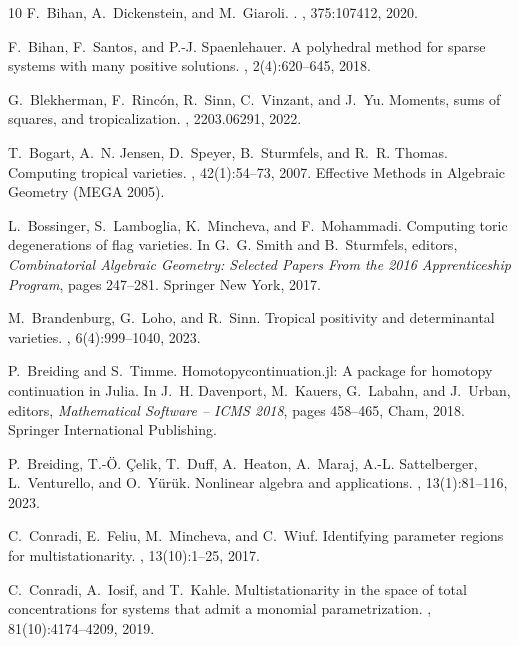 \documentclass{article}
\theoremstyle{definition}
\begin{document}
{\begin{thebibliography}{10}
F.~Bihan, A.~Dickenstein, and M.~Giaroli.
.
, 375:107412, 2020.

F.~Bihan, F.~Santos, and P.-J. Spaenlehauer.
\newblock A polyhedral method for sparse systems with many positive solutions.
, 2(4):620--645, 2018.

G.~Blekherman, F.~Rincón, R.~Sinn, C.~Vinzant, and J.~Yu.
\newblock Moments, sums of squares, and tropicalization.
, 2203.06291, 2022.

T.~Bogart, A.~N. Jensen, D.~Speyer, B.~Sturmfels, and R.~R. Thomas.
\newblock Computing tropical varieties.
, 42(1):54--73, 2007.
\newblock Effective Methods in Algebraic Geometry (MEGA 2005).

L.~Bossinger, S.~Lamboglia, K.~Mincheva, and F.~Mohammadi.
\newblock Computing toric degenerations of flag varieties.
\newblock In G.~G. Smith and B.~Sturmfels, editors, {\em Combinatorial Algebraic Geometry: Selected Papers From the 2016 Apprenticeship Program}, pages 247--281. Springer New York, 2017.

M.~Brandenburg, G.~Loho, and R.~Sinn.
\newblock Tropical positivity and determinantal varieties.
, 6(4):999--1040, 2023.

P.~Breiding and S.~Timme.
\newblock Homotopycontinuation.jl: A package for homotopy continuation in {J}ulia.
\newblock In J.~H. Davenport, M.~Kauers, G.~Labahn, and J.~Urban, editors, {\em Mathematical Software -- ICMS 2018}, pages 458--465, Cham, 2018. Springer International Publishing.

P.~Breiding, T.-Ö. Çelik, T.~Duff, A.~Heaton, A.~Maraj, A.-L. Sattelberger, L.~Venturello, and O.~Yürük.
\newblock Nonlinear algebra and applications.
, 13(1):81--116, 2023.

C.~Conradi, E.~Feliu, M.~Mincheva, and C.~Wiuf.
\newblock Identifying parameter regions for multistationarity.
, 13(10):1--25, 2017.

C.~Conradi, A.~Iosif, and T.~Kahle.
\newblock Multistationarity in the space of total concentrations for systems that admit a monomial parametrization.
, 81(10):4174--4209, 2019.


\end{thebibliography}}
\end{document}
